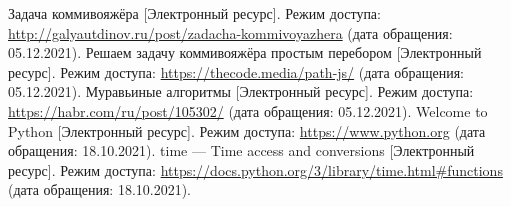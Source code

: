 %


\begin{thebibliography}{5}
	Задача коммивояжёра [Электронный ресурс]. Режим доступа: \url{http://galyautdinov.ru/post/zadacha-kommivoyazhera} (дата обращения: 05.12.2021).
	Решаем задачу коммивояжёра простым перебором [Электронный ресурс]. Режим доступа: \url{https://thecode.media/path-js/} (дата обращения: 05.12.2021).
	Муравьиные алгоритмы [Электронный ресурс]. Режим доступа: \url{https://habr.com/ru/post/105302/} (дата обращения: 05.12.2021).
	Welcome to Python [Электронный ресурс]. Режим доступа: \url{https://www.python.org} (дата обращения: 18.10.2021).
	time — Time access and conversions [Электронный ресурс]. Режим доступа: \url{https://docs.python.org/3/library/time.html#functions} (дата обращения: 18.10.2021).
\end{thebibliography}


% 
% 

